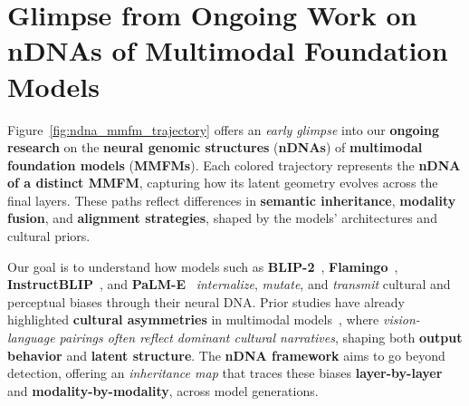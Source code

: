 \clearpage

\section*{Glimpse from Ongoing Work on nDNAs of Multimodal Foundation Models}

\vspace{-2mm}
\noindent
Figure~\ref{fig:ndna_mmfm_trajectory} offers an \emph{early glimpse} into our \textbf{ongoing research} on the \textbf{neural genomic structures} (\textbf{nDNAs}) of \textbf{multimodal foundation models} (\textbf{MMFMs}). Each colored trajectory represents the \textbf{nDNA of a distinct MMFM}, capturing how its latent geometry evolves across the final layers. These paths reflect differences in \textbf{semantic inheritance}, \textbf{modality fusion}, and \textbf{alignment strategies}, shaped by the models’ architectures and cultural priors.  

Our goal is to understand how models such as \textbf{BLIP-2}~\citep{li2023blip2}, \textbf{Flamingo}~\citep{alayrac2022flamingo}, \textbf{InstructBLIP}~\citep{dai2023instructblip}, and \textbf{PaLM-E}~\citep{driess2023palme} \emph{internalize}, \emph{mutate}, and \emph{transmit} cultural and perceptual biases through their neural DNA. Prior studies have already highlighted \textbf{cultural asymmetries} in multimodal models~\citep{birhane2021multimodal, denton2021genealogy, yang2023bias}, where \emph{vision-language pairings often reflect dominant cultural narratives}, shaping both \textbf{output behavior} and \textbf{latent structure}. The \textbf{nDNA framework} aims to go beyond detection, offering an \emph{inheritance map} that traces these biases \textbf{layer-by-layer} and \textbf{modality-by-modality}, across model generations.




